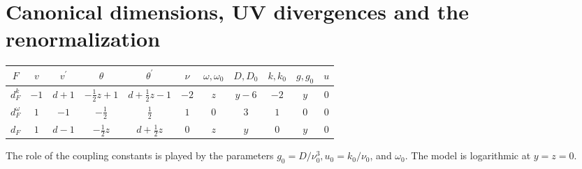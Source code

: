\documentclass[12pt]{article}
\begin{document}
\section{Canonical dimensions, UV divergences and the renormalization}
\label{sec:Reno}
\begin{tabular} {|c|c|c|c|c|c|c|c|c|c|c|}
    \hline
    $F$            &  $v$   &   $v^{'}$  &   $\theta$            &     $\theta^{'}$            &        $\nu$     &     $\omega, \omega_{0}$    &      $D,D_{0}$     &   $k,k_{0}$      &   $g,g_{0}$       &   $u$    \\ \hline
    $d_F^k$        &  $-1$  &   $d+1$    &   $-\frac{1}{2}z+1$   &     $d+\frac{1}{2}z-1$      &        $-2$      &     $z$                     &      $y-6$         &   $-2$           &   $y$             &    0     \\ \hline
    $d_F^{\omega}$ &  $1$   &   $-1$     &   $-\frac{1}{2}$      &     $\frac{1}{2}$           &        $1$       &     $0$                     &      $3$           &   $1$            &   $0$             &    0     \\ \hline
    $d_F$          &  $1$   &   $d-1$    &   $-\frac{1}{2}z$     &     $d+\frac{1}{2}z$        &        $0$       &     $z$                     &      $y$           &   $0$            &   $y$             &   $0$    \\ \hline
\end{tabular}

The role of the coupling constants is played by the parameters $g_0 = D/\nu^3_0, u_0 = k_0/\nu_0$, and $\omega_0$. The model is logarithmic at  $y = z = 0$.
\end{document}
